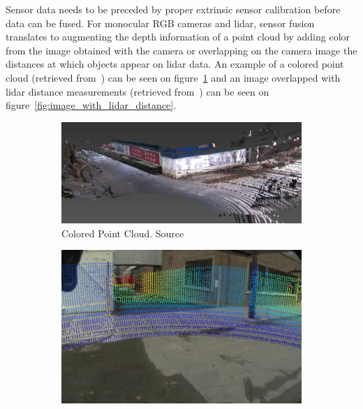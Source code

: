 Sensor data needs to be preceded by proper extrinsic sensor calibration before data can be fused. For monocular RGB cameras and \ac{lidar}, sensor fusion translates to augmenting the depth information of a point cloud by adding color from the image obtained with the camera or overlapping on the camera image the distances at which objects appear on \ac{lidar} data. An example of a colored point cloud (retrieved from~\cite{Gong2013}) can be seen on figure~\ref{fig:colored_point_cloud_example} and an image overlapped with \ac{lidar} distance measurements (retrieved from~\cite{Bileschi2009}) can be seen on figure~\ref{fig:image_with_lidar_distance}.

\begin{figure}[!ht]
	\centering
	\begin{subfigure}[t]{0.55\textwidth}
		\includegraphics[width=\textwidth]{img/sensor_fusion/colored_point_cloud.png}
		\caption{Colored Point Cloud. Source~\cite{Gong2013}}
		\label{fig:colored_point_cloud_example}
	\end{subfigure}
	\quad
	\begin{subfigure}[t]{0.40\textwidth}
		\includegraphics[width=\textwidth]{img/sensor_fusion/image_with_distance_point_cutted.png}

\end{subfigure}
\end{figure}
